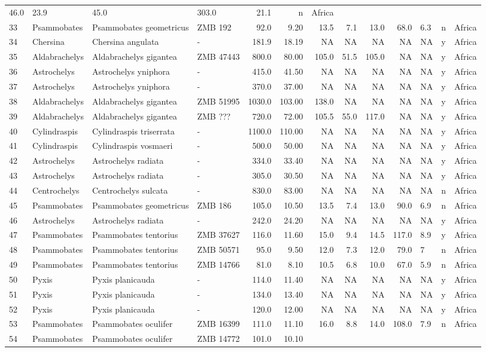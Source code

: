 \begin{landscape}
{\begin{longtable}[]{@{}llllrrrrrrlll@{}}
	46.0 & 23.9 & 45.0 & 303.0 & 21.1 & n & Africa\tabularnewline
	33 & Psammobates & Psammobates geometricus & ZMB 192 & 92.0 & 9.20 &
	13.5 & 7.1 & 13.0 & 68.0 & 6.3 & n & Africa\tabularnewline
	34 & Chersina & Chersina angulata & - & 181.9 & 18.19 & NA & NA & NA &
	NA & NA & y & Africa\tabularnewline
	35 & Aldabrachelys & Aldabrachelys gigantea & ZMB 47443 & 800.0 & 80.00
	& 105.0 & 51.5 & 105.0 & NA & NA & y & Africa\tabularnewline
	36 & Astrochelys & Astrochelys yniphora & - & 415.0 & 41.50 & NA & NA &
	NA & NA & NA & y & Africa\tabularnewline
	37 & Astrochelys & Astrochelys yniphora & - & 370.0 & 37.00 & NA & NA &
	NA & NA & NA & y & Africa\tabularnewline
	38 & Aldabrachelys & Aldabrachelys gigantea & ZMB 51995 & 1030.0 &
	103.00 & 138.0 & NA & NA & NA & NA & y & Africa\tabularnewline
	39 & Aldabrachelys & Aldabrachelys gigantea & ZMB ??? & 720.0 & 72.00 &
	105.5 & 55.0 & 117.0 & NA & NA & y & Africa\tabularnewline
	40 & Cylindraspis & Cylindraspis triserrata & - & 1100.0 & 110.00 & NA &
	NA & NA & NA & NA & y & Africa\tabularnewline
	41 & Cylindraspis & Cylindraspis vosmaeri & - & 500.0 & 50.00 & NA & NA
	& NA & NA & NA & y & Africa\tabularnewline
	42 & Astrochelys & Astrochelys radiata & - & 334.0 & 33.40 & NA & NA &
	NA & NA & NA & y & Africa\tabularnewline
	43 & Astrochelys & Astrochelys radiata & - & 305.0 & 30.50 & NA & NA &
	NA & NA & NA & y & Africa\tabularnewline
	44 & Centrochelys & Centrochelys sulcata & - & 830.0 & 83.00 & NA & NA &
	NA & NA & NA & n & Africa\tabularnewline
	45 & Psammobates & Psammobates geometricus & ZMB 186 & 105.0 & 10.50 &
	13.5 & 7.4 & 13.0 & 90.0 & 6.9 & n & Africa\tabularnewline
	46 & Astrochelys & Astrochelys radiata & - & 242.0 & 24.20 & NA & NA &
	NA & NA & NA & y & Africa\tabularnewline
	47 & Psammobates & Psammobates tentorius & ZMB 37627 & 116.0 & 11.60 &
	15.0 & 9.4 & 14.5 & 117.0 & 8.9 & y & Africa\tabularnewline
	48 & Psammobates & Psammobates tentorius & ZMB 50571 & 95.0 & 9.50 &
	12.0 & 7.3 & 12.0 & 79.0 & 7 & n & Africa\tabularnewline
	49 & Psammobates & Psammobates tentorius & ZMB 14766 & 81.0 & 8.10 &
	10.5 & 6.8 & 10.0 & 67.0 & 5.9 & n & Africa\tabularnewline
	50 & Pyxis & Pyxis planicauda & - & 114.0 & 11.40 & NA & NA & NA & NA &
	NA & y & Africa\tabularnewline
	51 & Pyxis & Pyxis planicauda & - & 134.0 & 13.40 & NA & NA & NA & NA &
	NA & y & Africa\tabularnewline
	52 & Pyxis & Pyxis planicauda & - & 120.0 & 12.00 & NA & NA & NA & NA &
	NA & y & Africa\tabularnewline
	53 & Psammobates & Psammobates oculifer & ZMB 16399 & 111.0 & 11.10 &
	16.0 & 8.8 & 14.0 & 108.0 & 7.9 & n & Africa\tabularnewline
	54 & Psammobates & Psammobates oculifer & ZMB 14772 & 101.0 & 10.10 &

\end{longtable}}
\end{landscape}
